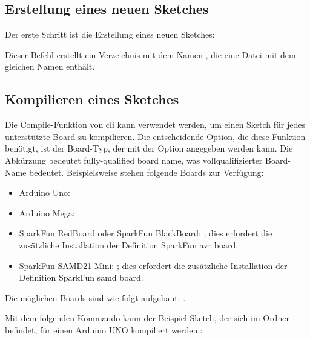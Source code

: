 \medskip





\subsection{Erstellung eines neuen Sketches}

Der erste Schritt ist die Erstellung eines neuen Sketches:

\medskip


\medskip

Dieser Befehl erstellt ein Verzeichnis mit dem Namen , die eine Datei mit dem gleichen Namen enthält.

\subsection{Kompilieren eines Sketches}

Die Compile-Funktion von \ac{cli} kann verwendet werden, um einen Sketch für jedes unterstützte Board zu kompilieren. Die entscheidende Option, die diese Funktion benötigt, ist der Board-Typ, der mit der Option  angegeben werden kann. Die Abkürzung  bedeutet \glqq fully-qualified board name\grqq, was \glqq vollqualifizierter Board-Name\grqq{} bedeutet. Beispielsweise stehen folgende Boards zur Verfügung:


\begin{itemize}
  \item Arduino Uno: 
  \item Arduino Mega: 
  \item SparkFun RedBoard oder SparkFun BlackBoard: ; dies erfordert die zusätzliche Installation der Definition \glqq SparkFun avr board\grqq.
  \item  SparkFun SAMD21 Mini: ; dies erfordert die zusätzliche Installation der Definition \glqq SparkFun samd board\grqq.
\end{itemize}

Die möglichen Boards sind wie folgt aufgebaut:  .

\bigskip

Mit dem folgenden Kommando kann der Beispiel-Sketch, der sich im Ordner   befindet, für einen Arduino UNO kompiliert werden.:

